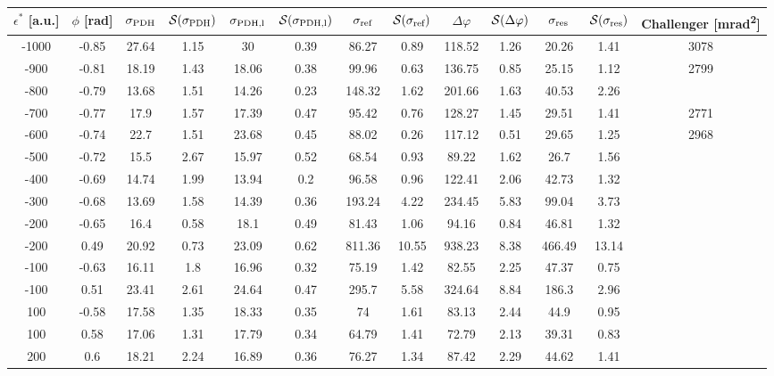 \begin{landscape}
	
	\begin{table}
	\centering
	\begin{tabular}{|c|c|c|c|c|c|c|c|c|c|c|c|c|}
		\hline
		$\epsilon^*$ [a.u.] & $\phi$ [\si{\radian}] & $\sigma_{\text{PDH}}$ & $\mathcal{S}(\sigma_{\text{PDH}})$ & $\sigma_{\text{PDH,l}}$ & $\mathcal{S}(\sigma_{\text{PDH,l}})$  & $\sigma_{\text{ref}}$ & $\mathcal{S}(\sigma_{\text{ref}})$ & $\Delta \varphi$ & $\mathcal{S}(\Delta \varphi)$ & $\sigma_{\text{res}}$  & $\mathcal{S}(\sigma_{\text{res}})$ & Challenger [\si{\milli\radian\squared}] \\
		\hline
		\hline
		-1000 & -0.85 & 27.64 & 1.15 & 30 & 0.39 & 86.27 & 0.89 & 118.52 & 1.26 & 20.26 & 1.41 & 3078\\
		-900 & -0.81 & 18.19 & 1.43 & 18.06 & 0.38 & 99.96 & 0.63 & 136.75 & 0.85 & 25.15 & 1.12 & 2799\\
		-800 & -0.79 & 13.68 & 1.51 & 14.26 & 0.23 & 148.32 & 1.62 & 201.66 & 1.63 & 40.53 & 2.26 & \\
		-700 & -0.77 & 17.9 & 1.57 & 17.39 & 0.47 & 95.42 & 0.76 & 128.27 & 1.45 & 29.51 & 1.41 & 2771\\
		-600 & -0.74 & 22.7 & 1.51 & 23.68 & 0.45 & 88.02 & 0.26 & 117.12 & 0.51 & 29.65 & 1.25 & 2968\\
		-500 & -0.72 & 15.5 & 2.67 & 15.97 & 0.52 & 68.54 & 0.93 & 89.22 & 1.62 & 26.7 & 1.56 & \\
		-400 & -0.69 & 14.74 & 1.99 & 13.94 & 0.2 & 96.58 & 0.96 & 122.41 & 2.06 & 42.73 & 1.32 & \\
		-300 & -0.68 & 13.69 & 1.58 & 14.39 & 0.36 & 193.24 & 4.22 & 234.45 & 5.83 & 99.04 & 3.73 & \\
		-200 & -0.65 & 16.4 & 0.58 & 18.1 & 0.49 & 81.43 & 1.06 & 94.16 & 0.84 & 46.81 & 1.32 & \\
		-200 & 0.49 & 20.92 & 0.73 & 23.09 & 0.62 & 811.36 & 10.55 & 938.23 & 8.38 & 466.49 & 13.14 & \\
		-100 & -0.63 & 16.11 & 1.8 & 16.96 & 0.32 & 75.19 & 1.42 & 82.55 & 2.25 & 47.37 & 0.75 & \\
		-100 & 0.51 & 23.41 & 2.61 & 24.64 & 0.47 & 295.7 & 5.58 & 324.64 & 8.84 & 186.3 & 2.96 & \\
		100 & -0.58 & 17.58 & 1.35 & 18.33 & 0.35 & 74 & 1.61 & 83.13 & 2.44 & 44.9 & 0.95 & \\
		100 & 0.58 & 17.06 & 1.31 & 17.79 & 0.34 & 64.79 & 1.41 & 72.79 & 2.13 & 39.31 & 0.83 & \\
		200 & 0.6 & 18.21 & 2.24 & 16.89 & 0.36 & 76.27 & 1.34 & 87.42 & 2.29 & 44.62 & 1.41 & \\

\end{tabular}
\end{table}
\end{landscape}
